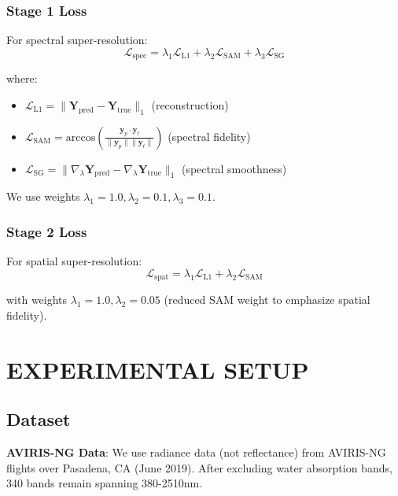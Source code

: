 \documentclass[]{spieman}
\begin{document}
\subsubsection{Stage 1 Loss}

For spectral super-resolution:
\begin{equation}
\mathcal{L}_{\text{spec}} = \lambda_1 \mathcal{L}_{\text{L1}} + \lambda_2 \mathcal{L}_{\text{SAM}} + \lambda_3 \mathcal{L}_{\text{SG}}
\end{equation}

where:
\begin{itemize}
\item $\mathcal{L}_{\text{L1}} = \|\mathbf{Y}_{\text{pred}} - \mathbf{Y}_{\text{true}}\|_1$ (reconstruction)
\item $\mathcal{L}_{\text{SAM}} = \text{arccos}\left(\frac{\mathbf{y}_p \cdot \mathbf{y}_t}{\|\mathbf{y}_p\| \|\mathbf{y}_t\|}\right)$ (spectral fidelity)
\item $\mathcal{L}_{\text{SG}} = \|\nabla_\lambda \mathbf{Y}_{\text{pred}} - \nabla_\lambda \mathbf{Y}_{\text{true}}\|_1$ (spectral smoothness)
\end{itemize}

We use weights $\lambda_1=1.0, \lambda_2=0.1, \lambda_3=0.1$.

\subsubsection{Stage 2 Loss}

For spatial super-resolution:
\begin{equation}
\mathcal{L}_{\text{spat}} = \lambda_1 \mathcal{L}_{\text{L1}} + \lambda_2 \mathcal{L}_{\text{SAM}}
\end{equation}

with weights $\lambda_1=1.0, \lambda_2=0.05$ (reduced SAM weight to emphasize spatial fidelity).

\section{EXPERIMENTAL SETUP}
\label{sec:experiments}

\subsection{Dataset}

\textbf{AVIRIS-NG Data}: We use radiance data (not reflectance) from AVIRIS-NG flights over Pasadena, CA (June 2019). After excluding water absorption bands, 340 bands remain spanning 380-2510nm.
\end{document}
